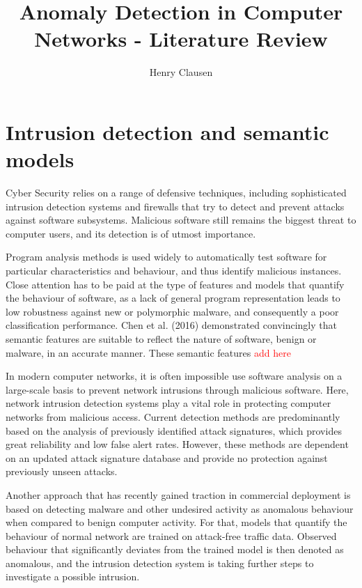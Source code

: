 \documentclass[a4paper,12pt,twoside]{report}
\begin{document}
\title{\LARGE {\bf Anomaly Detection in Computer Networks - Literature Review}\\
 \vspace*{6mm}
}

\author{Henry Clausen}

\maketitle

\section*{Intrusion detection and semantic models}


Cyber Security relies on a range of defensive techniques, including sophisticated intrusion detection systems and firewalls that try to detect and prevent attacks against software subsystems. Malicious software still remains the biggest threat to computer users, and its detection is of utmost importance. 

Program analysis methods is used widely to automatically test software for particular characteristics and behaviour, and thus identify malicious instances. Close attention has to be paid at the type of features and models that quantify the behaviour of software, as a lack of general program representation leads to low robustness against new or polymorphic malware, and consequently a poor classification performance.  Chen et al.  (2016) \cite{chen2016robust, chen2016more} demonstrated convincingly that semantic features are suitable to reflect the nature of software, benign or malware, in an accurate manner. These semantic features \textcolor{red}{add here} 


In modern computer networks, it is often impossible use software analysis on a large-scale basis to prevent network intrusions through malicious software. Here, network intrusion detection systems play a vital role in protecting computer networks from malicious access. Current detection methods are predominantly based on the analysis of previously identified attack signatures, which provides great reliability and low false alert rates. However, these methods are dependent on an updated attack signature database and provide no protection against previously unseen attacks. 

Another approach that has recently gained traction in commercial deployment is based on detecting malware and other undesired activity as anomalous behaviour when compared to benign computer activity. For that, models that quantify the behaviour of normal network are trained on attack-free traffic data. Observed behaviour that significantly deviates from the trained model is then denoted as anomalous, and the intrusion detection system is taking further steps to investigate a possible intrusion. 
\end{document}
